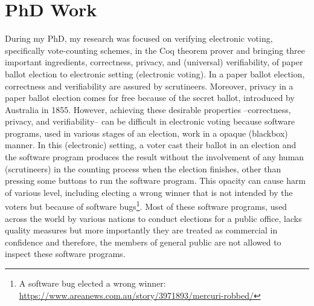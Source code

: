 \documentclass[a4paper]{article}
\begin{document}
\section{PhD Work}
During my PhD, my research was focused on verifying electronic voting, specifically vote-counting schemes, in 
the Coq theorem prover
and bringing  three important ingredients, correctness, privacy, and (universal) verifiability, of paper ballot election to 
electronic setting (electronic voting). In a paper ballot election, correctness and verifiability are
assured by scrutineers. Moreover, privacy in a paper ballot election comes for free because of the secret 
ballot, introduced by Australia in 1855.  However, achieving these desirable properties --correctness, 
privacy, and verifiability-- can be difficult in 
electronic voting because software programs, used in 
various stages of an election, work in a opaque (blackbox) manner. In this (electronic) setting, 
a voter cast their ballot in an election and the software program produces the result without the involvement 
of any human (scrutineers) in the counting process when the election finishes, other than pressing some 
buttons to run the software program. This opacity can cause harm of various level, including electing a 
wrong winner that is not intended by the voters but because 
of software bugs\footnote{A software bug elected a wrong winner: \url{https://www.areanews.com.au/story/3971893/mercuri-robbed/}}. Most of 
these software programs, used across the world by various nations to conduct elections for a public office, 
lacks quality measures \cite{10.1145/3014812.3014837, 9152765} but more importantly they are treated as commercial in confidence and therefore,
the members of general public are not allowed to inspect these software programs\cite{AEC:2013:LMM}.
\end{document}
